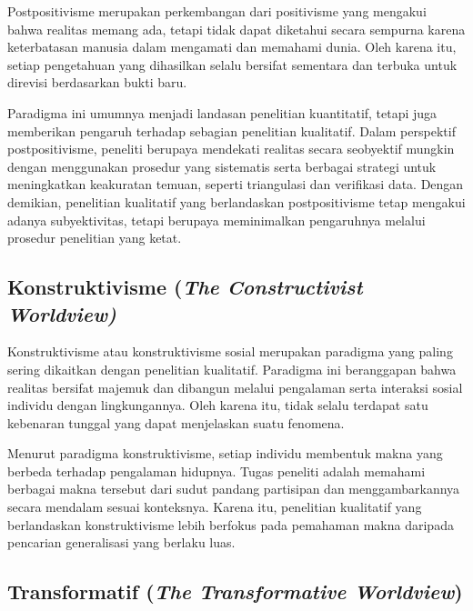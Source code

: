 \documentclass[
  indonesian,
  letterpaper,
  DIV=11,
  numbers=noendperiod]{scrreprt}
\begin{document}
Postpositivisme merupakan perkembangan dari positivisme yang mengakui
bahwa realitas memang ada, tetapi tidak dapat diketahui secara sempurna
karena keterbatasan manusia dalam mengamati dan memahami dunia. Oleh
karena itu, setiap pengetahuan yang dihasilkan selalu bersifat sementara
dan terbuka untuk direvisi berdasarkan bukti baru.

Paradigma ini umumnya menjadi landasan penelitian kuantitatif, tetapi
juga memberikan pengaruh terhadap sebagian penelitian kualitatif. Dalam
perspektif postpositivisme, peneliti berupaya mendekati realitas secara
seobyektif mungkin dengan menggunakan prosedur yang sistematis serta
berbagai strategi untuk meningkatkan keakuratan temuan, seperti
triangulasi dan verifikasi data. Dengan demikian, penelitian kualitatif
yang berlandaskan postpositivisme tetap mengakui adanya subyektivitas,
tetapi berupaya meminimalkan pengaruhnya melalui prosedur penelitian
yang ketat.

\subsection{\texorpdfstring{Konstruktivisme (\emph{The Constructivist
Worldview)}}{Konstruktivisme (The Constructivist Worldview)}}\label{konstruktivisme-the-constructivist-worldview}

Konstruktivisme atau konstruktivisme sosial merupakan paradigma yang
paling sering dikaitkan dengan penelitian kualitatif. Paradigma ini
beranggapan bahwa realitas bersifat majemuk dan dibangun melalui
pengalaman serta interaksi sosial individu dengan lingkungannya. Oleh
karena itu, tidak selalu terdapat satu kebenaran tunggal yang dapat
menjelaskan suatu fenomena.

Menurut paradigma konstruktivisme, setiap individu membentuk makna yang
berbeda terhadap pengalaman hidupnya. Tugas peneliti adalah memahami
berbagai makna tersebut dari sudut pandang partisipan dan
menggambarkannya secara mendalam sesuai konteksnya. Karena itu,
penelitian kualitatif yang berlandaskan konstruktivisme lebih berfokus
pada pemahaman makna daripada pencarian generalisasi yang berlaku luas.

\subsection{\texorpdfstring{Transformatif (\emph{The Transformative
Worldview})}{Transformatif (The Transformative Worldview)}}\label{transformatif-the-transformative-worldview}
\end{document}
